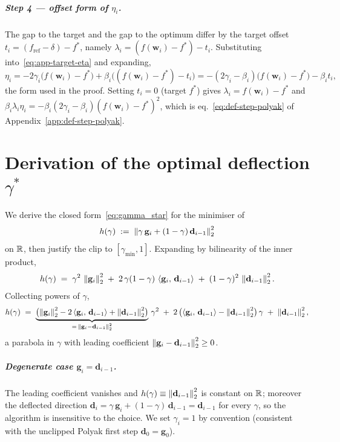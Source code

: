 \paragraph{Step 4 --- offset form of $\eta_i$.} The gap to the target and the gap to the optimum differ by the target offset $t_i = (f_{\mathrm{ref}}-\delta)-f^*$, namely $\lambda_i = (f(\mathbf{w}_i)-f^*) - t_i$. Substituting into~\eqref{eq:app-target-eta} and expanding,
\[
\eta_i = -2\gamma_i\big(f(\mathbf{w}_i)-f^*\big)+\beta_i\big((f(\mathbf{w}_i)-f^*)-t_i\big) = -(2\gamma_i-\beta_i)\big(f(\mathbf{w}_i)-f^*\big) - \beta_i t_i,
\]
the form used in the proof. Setting $t_i=0$ (target $f^*$) gives $\lambda_i = f(\mathbf{w}_i)-f^*$ and $\beta_i\lambda_i\eta_i = -\beta_i(2\gamma_i-\beta_i)(f(\mathbf{w}_i)-f^*)^2$, which is eq.~\eqref{eq:def-step-polyak} of Appendix~\ref{app:def-step-polyak}.

\chapter{Derivation of the optimal deflection \texorpdfstring{$\gamma^{*}$}{gamma*}}
\label{app:gamma-star}

We derive the closed form~\eqref{eq:gamma_star} for the minimiser of
\[
h(\gamma) \;:=\; \left\lVert \gamma\,\mathbf{g}_i + (1-\gamma)\,\mathbf{d}_{i-1} \right\rVert_2^{2}
\]
on $\mathbb{R}$, then justify the clip to $[\gamma_{\min}, 1]$. Expanding by bilinearity of the inner product,
\[
h(\gamma) \;=\; \gamma^{2}\,\left\lVert \mathbf{g}_i \right\rVert_2^{2} \;+\; 2\,\gamma(1-\gamma)\,\left\langle \mathbf{g}_i,\, \mathbf{d}_{i-1} \right\rangle \;+\; (1-\gamma)^{2}\,\left\lVert \mathbf{d}_{i-1} \right\rVert_2^{2}.
\]
Collecting powers of $\gamma$,
\begin{equation}\label{eq:app-gamma-parabola}
h(\gamma) \;=\; \underbrace{\bigl(\left\lVert \mathbf{g}_i \right\rVert_2^{2} - 2\left\langle \mathbf{g}_i,\, \mathbf{d}_{i-1} \right\rangle + \left\lVert \mathbf{d}_{i-1} \right\rVert_2^{2}\bigr)}_{=\,\left\lVert \mathbf{g}_i - \mathbf{d}_{i-1} \right\rVert_2^{2}}\,\gamma^{2} \;+\; 2\,\bigl(\left\langle \mathbf{g}_i,\, \mathbf{d}_{i-1} \right\rangle - \left\lVert \mathbf{d}_{i-1} \right\rVert_2^{2}\bigr)\,\gamma \;+\; \left\lVert \mathbf{d}_{i-1} \right\rVert_2^{2},
\end{equation}
a parabola in $\gamma$ with leading coefficient $\left\lVert \mathbf{g}_i - \mathbf{d}_{i-1} \right\rVert_2^{2} \ge 0$.

\paragraph{Degenerate case $\mathbf{g}_i = \mathbf{d}_{i-1}$.}
The leading coefficient vanishes and $h(\gamma) \equiv \left\lVert \mathbf{d}_{i-1} \right\rVert_2^{2}$ is constant on $\mathbb{R}$; moreover the deflected direction $\mathbf{d}_i = \gamma\,\mathbf{g}_i + (1-\gamma)\,\mathbf{d}_{i-1} = \mathbf{d}_{i-1}$ for every $\gamma$, so the algorithm is insensitive to the choice. We set $\gamma_i = 1$ by convention (consistent with the unclipped Polyak first step $\mathbf{d}_0 = \mathbf{g}_0$).

